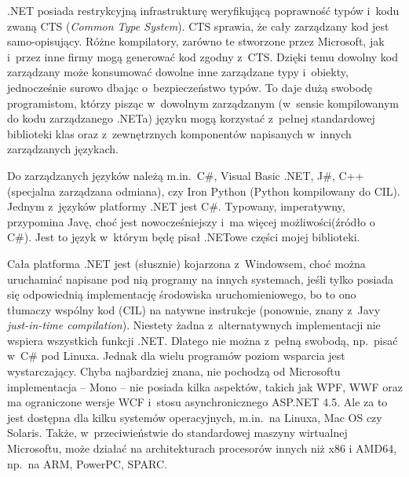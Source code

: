 .NET posiada restrykcyjną infrastrukturę weryfikującą poprawność typów i~kodu zwaną CTS (\emph{Common Type System}). CTS sprawia, że cały zarządzany kod jest samo-opisujący. Różne kompilatory, zarówno te stworzone przez Microsoft, jak i~przez inne firmy mogą generować kod zgodny z~CTS\@. Dzięki temu dowolny kod zarządzany może konsumować dowolne inne zarządzane typy i~obiekty, jednocześnie surowo dbając o~bezpieczeństwo typów. To daje dużą swobodę programistom, którzy pisząc w~dowolnym zarządzanym (w~sensie kompilowanym do kodu zarządzanego .NETa) języku mogą korzystać z~pełnej standardowej biblioteki klas oraz z~zewnętrznych komponentów napisanych w~innych zarządzanych językach.

Do zarządzanych języków należą m.in.\ C\#, Visual Basic .NET, J\#, C++ (specjalna zarządzana odmiana), czy Iron Python (Python kompilowany do CIL). Jednym z~języków platformy .NET jest C\#. Typowany, imperatywny, przypomina Javę, choć jest nowocześniejszy i~ma więcej możliwości(źródło o C\#). Jest to język w~którym będę pisał .NETowe części mojej biblioteki.

Cała platforma .NET jest (słusznie\cite{dot-net-requirements}) kojarzona z~Windowsem, choć można uruchamiać napisane pod nią programy na innych systemach, jeśli tylko posiada się odpowiednią implementację środowiska uruchomieniowego, bo to ono tłumaczy wspólny kod (CIL) na natywne instrukcje (ponownie, znany z~Javy \emph{just-in-time compilation}). Niestety żadna z~alternatywnych implementacji nie wspiera wszystkich funkcji .NET\@.
Dlatego nie można z~pełną swobodą, np.\ pisać w~C\# pod Linuxa. Jednak dla wielu programów poziom wsparcia jest wystarczający.
Chyba najbardziej znana, nie pochodzą od Microsoftu implementacja -- Mono -- nie posiada kilka aspektów, takich jak WPF, WWF oraz ma ograniczone wersje WCF i~stosu asynchronicznego ASP.NET 4.5\cite{mono-compatibility}. Ale za to jest dostępna dla kilku systemów operacyjnych, m.in.\ na Linuxa, Mac OS czy Solaris\cite{mono-supported-platforms}. Także, w~przeciwieństwie do standardowej maszyny wirtualnej Microsoftu, może działać na architekturach procesorów innych niż x86 i AMD64\cite{dot-net-requirements}, np.\ na ARM, PowerPC, SPARC.

